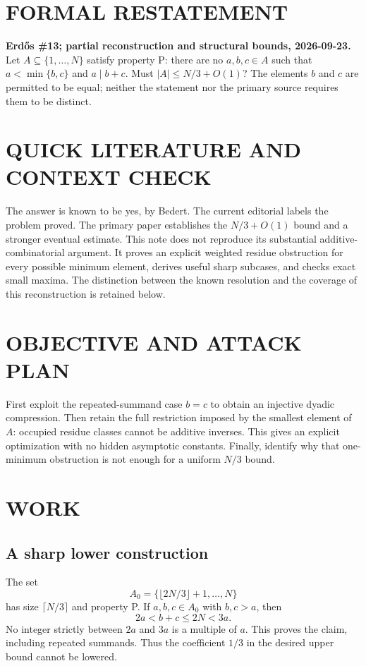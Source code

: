 \section{FORMAL RESTATEMENT}
\textbf{Erd\H{o}s \#13; partial reconstruction and structural bounds, 2026-09-23.}
Let $A\subseteq\{1,\ldots,N\}$ satisfy property P: there are no $a,b,c\in A$ such that $a<\min\{b,c\}$ and $a\mid b+c$. Must $|A|\le N/3+O(1)$? The elements $b$ and $c$ are permitted to be equal; neither the statement nor the primary source requires them to be distinct.

\section{QUICK LITERATURE AND CONTEXT CHECK}
The answer is known to be yes, by Bedert. The current editorial labels the problem proved. The primary paper establishes the $N/3+O(1)$ bound and a stronger eventual estimate. This note does not reproduce its substantial additive-combinatorial argument. It proves an explicit weighted residue obstruction for every possible minimum element, derives useful sharp subcases, and checks exact small maxima. The distinction between the known resolution and the coverage of this reconstruction is retained below.

\section{OBJECTIVE AND ATTACK PLAN}
First exploit the repeated-summand case $b=c$ to obtain an injective dyadic compression. Then retain the full restriction imposed by the smallest element of $A$: occupied residue classes cannot be additive inverses. This gives an explicit optimization with no hidden asymptotic constants. Finally, identify why that one-minimum obstruction is not enough for a uniform $N/3$ bound.

\section{WORK}
\subsection{A sharp lower construction}
The set
\[
 A_0=\{\lfloor2N/3\rfloor+1,\ldots,N\}
\]
has size $\lceil N/3\rceil$ and property P. If $a,b,c\in A_0$ with $b,c>a$, then
\[
 2a<b+c\le2N<3a.
\]
No integer strictly between $2a$ and $3a$ is a multiple of $a$. This proves the claim, including repeated summands. Thus the coefficient $1/3$ in the desired upper bound cannot be lowered.

